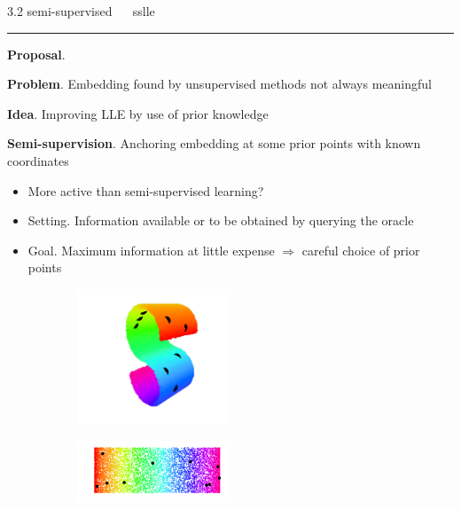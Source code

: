 \documentclass[11pt, compress, t, notes = noshow, xcolor = table, 
aspectratio = 1610]{beamer}
\newcommand{\highlight}[1]{\textcolor{highlightcol}{\textbf{#1}}}
\newcommand{\arritem}{\item[\highlight{$\rightarrow$}]}
\begin{document}
\LARGE
\begin{frame}{\textcolor{gray!90}{3.2 semi-supervised} ~~ sslle}
\normalsize
\vspace{-0.5cm}
\noindent \textcolor{gray!90}{\rule{\textwidth}{1pt}}
\smallskip

\textbf{Proposal}. \citet{yangetal2006}

\vspace{0.3cm}

\textbf{Problem}. Embedding found by unsupervised methods not always meaningful

\vspace{0.3cm}

\textbf{Idea}. Improving LLE by use of prior knowledge

\vspace{0.3cm}

\textbf{Semi-supervision}. Anchoring embedding at some prior points with known 
coordinates

\begin{itemize}
  \arritem More active than semi-supervised learning?
  \arritem Setting. Information available or to be obtained by querying the 
  oracle
  \arritem Goal. Maximum information at little expense $\Rightarrow$ careful 
  choice of prior points
\end{itemize}

\vspace{0.3cm}

\begin{figure}[H]
 \begin{subfigure}[c]{0.2\textwidth}
  \centering
   \includegraphics[trim = 70 30 70 30, clip, %
      width = 0.5\textwidth]{figures/s-curve-pp}
 \end{subfigure}
 \hfill
 \begin{subfigure}[c]{0.7\textwidth}
   \includegraphics[trim = 80 20 0 0, clip, %
      width = 0.5\textwidth]{figures/s-curve-undone-pp}
 \end{subfigure}
\end{figure}

\end{frame}
\end{document}
